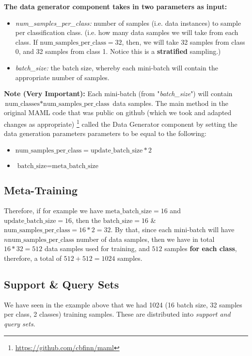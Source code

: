 \documentclass{article}
\begin{document}
\noindent\textbf{The data generator component takes in two parameters as input:}
\begin{itemize}
\item \textit{num\_samples\_per\_class:} number of samples (i.e. data instances) to sample per classification class. (i.e. how many data samples we will take from each class. If $\text{num\_samples\_per\_class}= 32$, then, we will take 32 samples from class 0, and 32 samples from class 1. Notice this is a \textbf{stratified} sampling.)
\item \textit{batch\_size:} the batch size, whereby each mini-batch will contain the appropriate number of samples. 
\end{itemize}

\noindent\textbf{Note (Very Important):} Each mini-batch (from "\textit{batch\_size}") will contain  $  \text{num\_classes} * \text{num\_samples\_per\_class}$ data samples. The main method in the original MAML code that was public on github (which we took and adapted changes as appropriate) \footnote{\url{https://github.com/cbfinn/maml}} called the Data Generator component by setting the data generation parameters parameters to be equal to the following:
\begin{itemize}
\item $\text{num\_samples\_per\_class} = \text{update\_batch\_size} * 2$
\item $\text{batch\_size} = \text{meta\_batch\_size}$
\end{itemize}

\subsection*{Meta-Training}
\noindent Therefore, if for example we have $\text{meta\_batch\_size} = 16$ and $\text{update\_batch\_size}=16$, then the $\text{batch\_ size} = 16 $ \& $\text{num\_samples\_per\_class} = 16 * 2 = 32$. By that, since each mini-batch will have $n\text{num\_samples\_per\_class}$ number of data samples, then we have in total $16 * 32 = 512$ data samples used for training, and $512$ samples \textbf{for each class}, therefore, a total of $512 + 512 = 1024$ samples.

\subsection*{Support \& Query Sets}
We have seen in the example above that we had 1024 (16 batch size, 32 samples per class, 2 classes) training samples. These are distributed into \textit{support and query sets}. 
\end{document}

